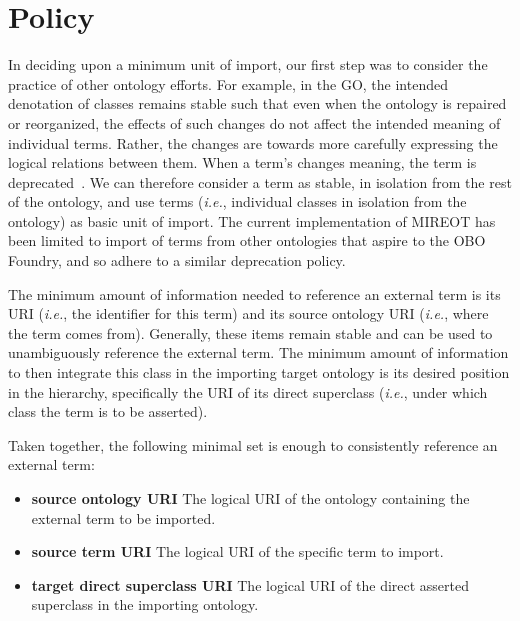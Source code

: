 \documentclass[jou]{ao2e}%
\begin{document}
\section{Policy}

In deciding upon a minimum unit of import, our first step was to consider the practice of other ontology efforts.
For example, in the \ac{GO}, the intended denotation of classes remains stable such that even when the ontology is repaired or reorganized, the effects of such changes do not affect the intended meaning of individual terms.
Rather, the changes are towards more carefully expressing the logical relations between them.
When a term's changes meaning, the term is deprecated~\citep{GOGuide}.
We can therefore consider a term as stable, in isolation from the rest of the ontology, and use terms (\emph{i.e.}, individual classes in isolation from the ontology) as basic unit of import.
The current implementation of \ac{MIREOT} has been limited to import of terms from other ontologies that aspire to the OBO Foundry, and so adhere to a similar deprecation policy.

The minimum amount of information needed to reference an external term is its URI (\textit {i.e.}, the identifier for this term) and its source ontology URI (\textit {i.e.}, where the term comes from). 
Generally, these items remain stable and can be used to unambiguously reference the external term.
The minimum amount of information to then integrate this class in the importing target ontology is its desired position in the hierarchy, specifically the URI of its direct superclass (\textit {i.e.}, under which class the term is to be asserted).

Taken together, the following minimal set is enough to consistently reference an external term:
\begin{itemize}
 \item \textbf{source ontology URI} The logical URI of the ontology containing the external term to be imported. 
 \item \textbf{source term URI} The logical URI of the specific term to import. 
 \item \textbf{target direct superclass URI} The logical URI of the direct asserted superclass in the importing ontology.
\end{itemize} 
\end{document}
